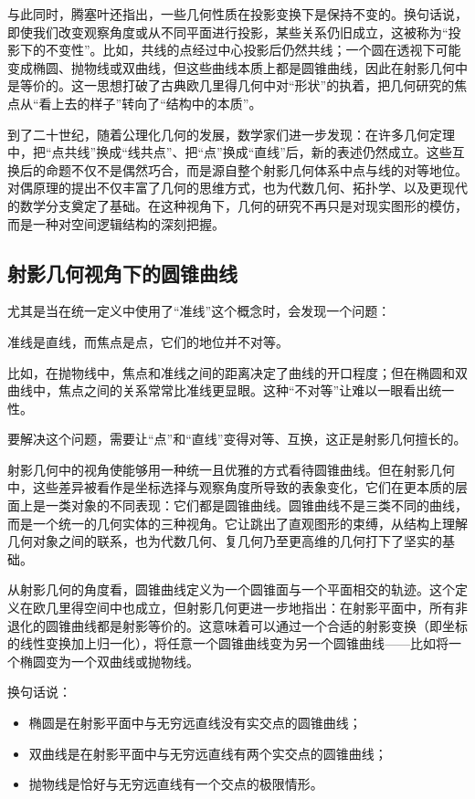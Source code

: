 与此同时，腾塞叶还指出，一些几何性质在投影变换下是保持不变的。换句话说，即使我们改变观察角度或从不同平面进行投影，某些关系仍旧成立，这被称为“投影下的不变性”。比如，共线的点经过中心投影后仍然共线；一个圆在透视下可能变成椭圆、抛物线或双曲线，但这些曲线本质上都是圆锥曲线，因此在射影几何中是等价的。这一思想打破了古典欧几里得几何中对“形状”的执着，把几何研究的焦点从“看上去的样子”转向了“结构中的本质”。

到了二十世纪，随着公理化几何的发展，数学家们进一步发现：在许多几何定理中，把“点共线”换成“线共点”、把“点”换成“直线”后，新的表述仍然成立。这些互换后的命题不仅不是偶然巧合，而是源自整个射影几何体系中点与线的对等地位。对偶原理的提出不仅丰富了几何的思维方式，也为代数几何、拓扑学、以及更现代的数学分支奠定了基础。在这种视角下，几何的研究不再只是对现实图形的模仿，而是一种对空间逻辑结构的深刻把握。


\subsection{射影几何视角下的圆锥曲线}


尤其是当在统一定义中使用了“准线”这个概念时，会发现一个问题：

准线是直线，而焦点是点，它们的地位并不对等。

比如，在抛物线中，焦点和准线之间的距离决定了曲线的开口程度；但在椭圆和双曲线中，焦点之间的关系常常比准线更显眼。这种“不对等”让难以一眼看出统一性。

要解决这个问题，需要让“点”和“直线”变得对等、互换，这正是射影几何擅长的。




射影几何中的视角使能够用一种统一且优雅的方式看待圆锥曲线。但在射影几何中，这些差异被看作是坐标选择与观察角度所导致的表象变化，它们在更本质的层面上是一类对象的不同表现：它们都是圆锥曲线。圆锥曲线不是三类不同的曲线，而是一个统一的几何实体的三种视角。它让跳出了直观图形的束缚，从结构上理解几何对象之间的联系，也为代数几何、复几何乃至更高维的几何打下了坚实的基础。

从射影几何的角度看，圆锥曲线定义为一个圆锥面与一个平面相交的轨迹。这个定义在欧几里得空间中也成立，但射影几何更进一步地指出：在射影平面中，所有非退化的圆锥曲线都是射影等价的。这意味着可以通过一个合适的射影变换（即坐标的线性变换加上归一化），将任意一个圆锥曲线变为另一个圆锥曲线——比如将一个椭圆变为一个双曲线或抛物线。

换句话说：
\begin{itemize}
\item 椭圆是在射影平面中与无穷远直线没有实交点的圆锥曲线；
\item 双曲线是在射影平面中与无穷远直线有两个实交点的圆锥曲线；
\item 抛物线是恰好与无穷远直线有一个交点的极限情形。
\end{itemize}

